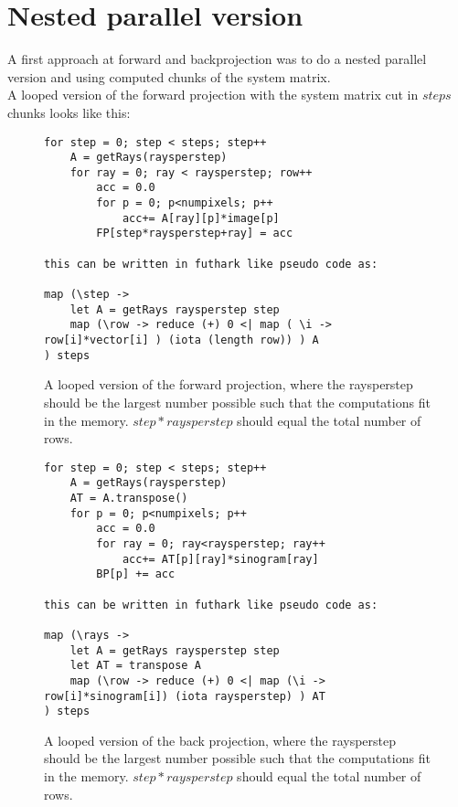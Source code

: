 \section{Nested parallel version}
A first approach at forward and backprojection was to do a nested parallel version and using computed chunks of the system matrix.\\
A looped version of the forward projection with the system matrix cut in $steps$ chunks looks like this:

\begin{figure}[h]
\begin{lstlisting}[frame=single]
for step = 0; step < steps; step++
	A = getRays(raysperstep)
	for ray = 0; ray < raysperstep; row++
		acc = 0.0
		for p = 0; p<numpixels; p++
			acc+= A[ray][p]*image[p]
		FP[step*raysperstep+ray] = acc

this can be written in futhark like pseudo code as:

map (\step ->
	let A = getRays raysperstep step
	map (\row -> reduce (+) 0 <| map ( \i -> row[i]*vector[i] ) (iota (length row)) ) A
) steps
\end{lstlisting}
\caption{A looped version of the forward projection, where the raysperstep should be the largest number possible such that the computations fit in the memory. $step*raysperstep$ should equal the total number of rows.}
\end{figure}
\begin{figure}[h]
\begin{lstlisting}[frame=single]
for step = 0; step < steps; step++
	A = getRays(raysperstep)
	AT = A.transpose()
	for p = 0; p<numpixels; p++
		acc = 0.0
		for ray = 0; ray<raysperstep; ray++
			acc+= AT[p][ray]*sinogram[ray]
		BP[p] += acc

this can be written in futhark like pseudo code as:

map (\rays ->
	let A = getRays raysperstep step
	let AT = transpose A
	map (\row -> reduce (+) 0 <| map (\i -> row[i]*sinogram[i]) (iota raysperstep) ) AT
) steps
\end{lstlisting}
  \caption{A looped version of the back projection, where the raysperstep should be the largest number possible such that the computations fit in the memory. $step*raysperstep$ should equal the total number of rows.}
\end{figure}

